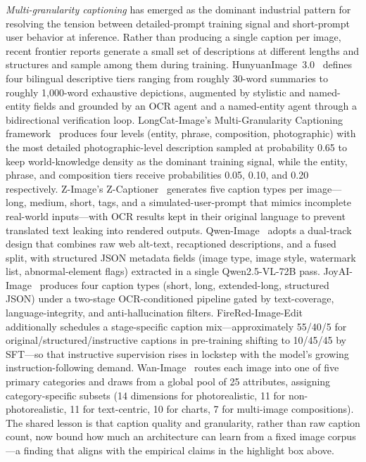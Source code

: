 \emph{Multi-granularity captioning} has emerged as the dominant industrial pattern for resolving the tension between detailed-prompt training signal and short-prompt user behavior at inference. Rather than producing a single caption per image, recent frontier reports generate a small set of descriptions at different lengths and structures and sample among them during training. HunyuanImage~3.0~\citep{cao2025hunyuanimage} defines four bilingual descriptive tiers ranging from roughly 30-word summaries to roughly 1{,}000-word exhaustive depictions, augmented by stylistic and named-entity fields and grounded by an OCR agent and a named-entity agent through a bidirectional verification loop. LongCat-Image's Multi-Granularity Captioning framework~\citep{team2025longcat} produces four levels (entity, phrase, composition, photographic) with the most detailed photographic-level description sampled at probability 0.65 to keep world-knowledge density as the dominant training signal, while the entity, phrase, and composition tiers receive probabilities 0.05, 0.10, and 0.20 respectively. Z-Image's Z-Captioner~\citep{cai2025z} generates five caption types per image---long, medium, short, tags, and a simulated-user-prompt that mimics incomplete real-world inputs---with OCR results kept in their original language to prevent translated text leaking into rendered outputs. Qwen-Image~\citep{wu2025qwen} adopts a dual-track design that combines raw web alt-text, recaptioned descriptions, and a fused split, with structured JSON metadata fields (image type, image style, watermark list, abnormal-element flags) extracted in a single Qwen2.5-VL-72B pass. JoyAI-Image~\citep{jdjoyaiimage} produces four caption types (short, long, extended-long, structured JSON) under a two-stage OCR-conditioned pipeline gated by text-coverage, language-integrity, and anti-hallucination filters. FireRed-Image-Edit~\citep{team2026firered} additionally schedules a stage-specific caption mix---approximately 55/40/5 for original/structured/instructive captions in pre-training shifting to 10/45/45 by SFT---so that instructive supervision rises in lockstep with the model's growing instruction-following demand. Wan-Image~\citep{mao2026wan} routes each image into one of five primary categories and draws from a global pool of 25 attributes, assigning category-specific subsets (14 dimensions for photorealistic, 11 for non-photorealistic, 11 for text-centric, 10 for charts, 7 for multi-image compositions). The shared lesson is that caption quality and granularity, rather than raw caption count, now bound how much an architecture can learn from a fixed image corpus---a finding that aligns with the empirical claims in the highlight box above.

